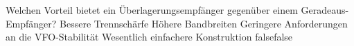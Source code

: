     {Welchen Vorteil bietet ein Überlagerungsempfänger gegenüber einem Geradeaus-Empfänger?}
    {Bessere Trennschärfe}
    {Höhere Bandbreiten}
    {Geringere Anforderungen an die VFO-Stabilität}
    {Wesentlich einfachere Konstruktion}
    {false}{false}